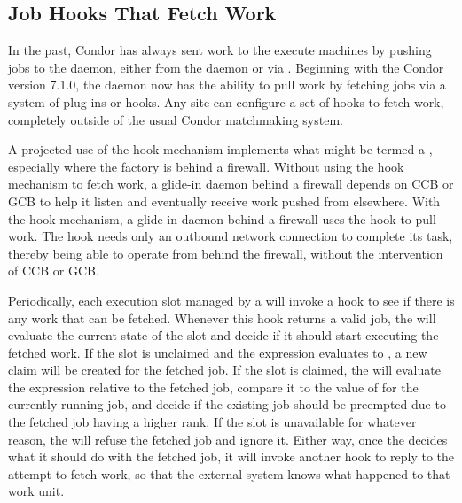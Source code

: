 \subsection{\label{sec:job-hooks}Job Hooks That Fetch Work}

In the past, Condor has always sent work to the execute machines by
pushing jobs to the  daemon, either from the 
daemon or via .
Beginning with the Condor version 7.1.0, the  daemon now has the
ability to pull work by fetching jobs via a system of plug-ins or
hooks.
Any site can configure a set of hooks to fetch work, completely
outside of the usual Condor matchmaking system.

A projected use of the hook mechanism implements what might
be termed a , especially where the
factory is behind a firewall.
Without using the hook mechanism to fetch work,
a glide-in  daemon behind a firewall
depends on CCB or GCB to help it listen and eventually receive
work pushed from elsewhere.
With the hook mechanism, a glide-in  daemon
behind a firewall uses the hook to pull work.
The hook needs only an outbound network connection to complete
its task,
thereby being able to operate from behind the firewall,
without the intervention of CCB or GCB.

Periodically, each execution slot managed by a  will
invoke a hook to see if there is any work that can be fetched.
Whenever this hook returns a valid job, the  will
evaluate the current state of the slot and decide if it should start
executing the fetched work.
If the slot is unclaimed and the  expression evaluates to
, a new claim will be created for the fetched job.
If the slot is claimed, the  will evaluate the
 expression relative to the fetched job, compare it to
the value of  for the currently running job, and decide
if the existing job should be preempted due to the fetched job having
a higher rank.
If the slot is unavailable for whatever reason, the 
will refuse the fetched job and ignore it.
Either way, once the  decides what it should do with
the fetched job, it will invoke another hook to reply to the attempt
to fetch work, so that the external system knows what happened to that
work unit.

